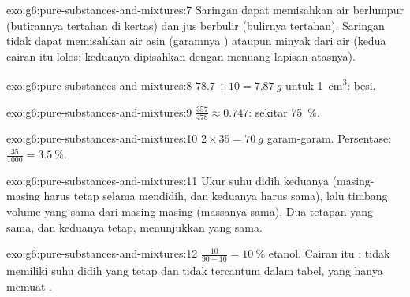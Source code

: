 \begin{solution}{exo:g6:pure-substances-and-mixtures:7}
Saringan dapat memisahkan air berlumpur (butirannya tertahan di
kertas) dan jus berbulir (bulirnya tertahan). Saringan tidak dapat
memisahkan air asin (garamnya ) ataupun minyak dari air (kedua
cairan itu lolos; keduanya dipisahkan dengan menuang lapisan atasnya).
\end{solution}

\begin{solution}{exo:g6:pure-substances-and-mixtures:8}
$78.7 \div 10 = \qty{7.87}{g}$ untuk \qty{1}{cm^3}: besi.
\end{solution}

\begin{solution}{exo:g6:pure-substances-and-mixtures:9}
$\frac{357}{478} \approx 0.747$: sekitar \qty{75}{\percent}.
\end{solution}

\begin{solution}{exo:g6:pure-substances-and-mixtures:10}
$2 \times 35 = \qty{70}{g}$ garam-garam. Persentase: $\frac{35}{1000} =
\qty{3.5}{\percent}$.
\end{solution}

\begin{solution}{exo:g6:pure-substances-and-mixtures:11}
Ukur suhu didih keduanya (masing-masing harus tetap selama mendidih, dan
keduanya harus sama), lalu timbang volume yang sama dari masing-masing
(massanya sama). Dua tetapan yang sama, dan keduanya tetap, menunjukkan
 yang sama.
\end{solution}

\begin{solution}{exo:g6:pure-substances-and-mixtures:12}
$\frac{10}{90 + 10} = \qty{10}{\percent}$ etanol. Cairan itu :
tidak memiliki suhu didih yang tetap dan tidak tercantum dalam tabel,
yang hanya memuat .
\end{solution}

